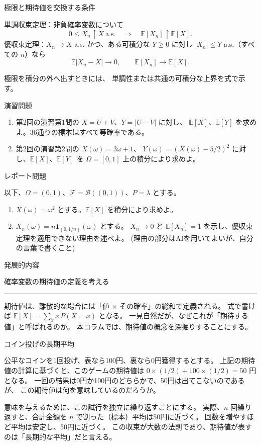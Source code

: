 \documentclass[a4paper,10pt,pdflatex,ja=standard,jafont=ipaex-type1,
  magstyle=real,scale=1]{bxjsarticle}
\newcommand{\coursename}{確率論と統計学 I}
\newcommand{\topic}[1]{\par\vspace{5pt}
  {\large\sffamily\mdseries\color{accent}#1}\par\vspace{2pt}}
\newcommand{\keybox}[1]{\par\vspace{3pt}\begingroup
  \setlength{\fboxsep}{5pt}
  \colorbox{soft}{\parbox{\dimexpr\linewidth-2\fboxsep\relax}{#1}}
  \endgroup\par\vspace{2pt}}
\newcommand{\examplelabel}[1]{{\sffamily\mdseries\color{ink}#1}}
\newcommand{\columnheading}[1]{\par\vspace{5pt}
  {\fontsize{11pt}{15pt}\selectfont\sffamily\mdseries\color{accent}#1}\par\vspace{2pt}}
\newcommand{\columnstart}[1]{\clearpage
  \fancyhead[L]{\small\color{ink}\coursename{}・発展的内容}
  {\small\sffamily\mdseries\color{accent}発展的内容}\par\vspace{4pt}
  {\Large\color{ink}#1}\par\vspace{2pt}
  {\color{accent}\rule{\linewidth}{0.7pt}}\par\vspace{4pt}}
\newcommand{\F}{\mathcal F}
\newcommand{\E}{\mathbb E}
\begin{document}
\topic{極限と期待値を交換する条件}
\examplelabel{単調収束定理：}非負確率変数について
$$
  0\le X_n\uparrow X\ \text{a.s.}
  \quad\Longrightarrow\quad \E[X_n]\uparrow\E[X].
$$
\examplelabel{優収束定理：}$X_n\to X$ a.s. かつ、ある可積分な $Y\ge0$ に対し
$|X_n|\le Y$ a.s.（すべての $n$）なら
$$
  \E|X_n-X|\longrightarrow0,\qquad \E[X_n]\longrightarrow\E[X].
$$

\keybox{極限を積分の外へ出すときには、
単調性または共通の可積分な上界を式で示す。}

\newpage
\topic{演習問題}
\begin{enumerate}[label=\arabic*.]
  \item 第2回の演習第1問の $X=U+V$、$Y=|U-V|$ に対し、
  $\E[X]$、$\E[Y]$ を求めよ。36通りの標本はすべて等確率である。
  \item 第2回の演習第2問の $X(\omega)=3\omega+1$、
  $Y(\omega)=(X(\omega)-5/2)^2$ に対し、$\E[X]$、$\E[Y]$ を
  $\Omega=[0,1]$ 上の積分により求めよ。
\end{enumerate}

\topic{レポート問題}
以下、$\Omega=(0,1)$、$\F=\mathcal B((0,1))$、$P=\lambda$ とする。
\begin{enumerate}[label=\arabic*.]
  \item $X(\omega)=\omega^2$ とする。$\E[X]$ を積分により求めよ。
  \item $X_n(\omega)=n\mathbf{1}_{(0,1/n)}(\omega)$ とする。
  $X_n\to0$ と $\E[X_n]=1$ を示し、優収束定理を適用できない理由を述べよ。 (理由の部分はAIを用いてよいが、自分の言葉で書くこと)
\end{enumerate}

\vfill

\columnstart{確率変数の期待値の定義を考える}
期待値は、離散的な場合には「値 $\times$ その確率」の総和で定義される。
式で書けば $\E[X]=\sum_x x\,P(X=x)$ となる。
一見自然だが、なぜこれが「期待する値」と呼ばれるのか。
本コラムでは、期待値の概念を深掘りすることにする。

\columnheading{コイン投げの長期平均}
公平なコインを1回投げ、表なら100円、裏なら0円獲得するとする。
上記の期待値の計算に基づくと、このゲームの期待値は
$0\times(1/2)+100\times(1/2)=50$ 円となる。
一回の結果は0円か100円のどちらかで、50円は出てこないのであるが、
この期待値は何を意味しているのだろうか。

意味を与えるために、この試行を独立に繰り返すことにする。
実際、$n$ 回繰り返すと、合計金額を $n$ で割った（標本）平均は50円に近づく。
回数を増やすほど平均は安定し、50円に近づく。
この収束が大数の法則であり、期待値が表すのは「長期的な平均」だと言える。
\end{document}

